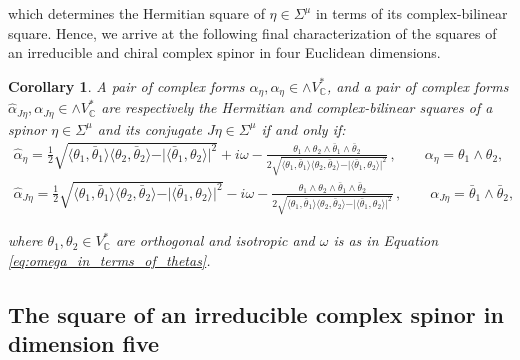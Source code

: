 \documentclass[10pt,a4paper,twoside,reqno]{amsart}
\theoremstyle{plain}
\newtheorem{cor}[thm]{Corollary}
\theoremstyle{definition}
\theoremstyle{remark}
\def\C{\mathbb{C}}
\begin{document}
\noindent
which determines the Hermitian square of $\eta \in \Sigma^{\mu}$ in terms of its complex-bilinear square. Hence, we arrive at the following final characterization of the squares of an irreducible and chiral complex spinor in four Euclidean dimensions.

\begin{cor}
A pair of complex forms $\widehat{\alpha}_\eta, \alpha_\eta \in \wedge V^{\ast}_{\mathbb{C}}$, and a pair of complex forms $\widehat{\alpha}_{J\eta}, \alpha_{J\eta} \in \wedge V^{\ast}_{\mathbb{C}}$ are respectively the Hermitian and complex-bilinear squares of a spinor $\eta\in\Sigma^\mu$ and its conjugate $J\eta\in\Sigma^\mu$ if and only if:
\begin{equation*}
\begin{aligned}
\widehat{\alpha}_{\eta} =    \frac{1}{2} \sqrt{\langle \theta_1 , \bar{\theta}_1 \rangle \langle \theta_2 , \bar{\theta}_2 \rangle - \vert \langle \bar{\theta}_1 , \theta_2 \rangle\vert^2} + i\omega-\frac{\theta_1 \wedge \theta_2 \wedge \bar{\theta}_1 \wedge \bar{\theta}_2}{2\sqrt{\langle \theta_1 , \bar{\theta}_1 \rangle \langle \theta_2 , \bar{\theta}_2 \rangle - \vert \langle \bar{\theta}_1 , \theta_2 \rangle\vert^2}} \, , \qquad \alpha_{\eta} = \theta_1 \wedge \theta_2,\\
\widehat{\alpha}_{J\eta} =    \frac{1}{2} \sqrt{\langle \theta_1 , \bar{\theta}_1 \rangle \langle \theta_2 , \bar{\theta}_2 \rangle - \vert \langle \bar{\theta}_1 , \theta_2 \rangle\vert^2} - i\omega-\frac{\theta_1 \wedge \theta_2 \wedge \bar{\theta}_1 \wedge \bar{\theta}_2}{2\sqrt{\langle \theta_1 , \bar{\theta}_1 \rangle \langle \theta_2 , \bar{\theta}_2 \rangle - \vert \langle \bar{\theta}_1 , \theta_2 \rangle\vert^2}} \, , \qquad \alpha_{J\eta} = \bar{\theta}_1 \wedge \bar{\theta}_2,
\end{aligned}
\end{equation*}

\noindent
where $\theta_1 , \theta_2 \in V^*_\C$ are orthogonal and isotropic and $\omega$ is as in Equation \eqref{eq:omega_in_terms_of_thetas}.
\end{cor}


\subsection{The square of an irreducible complex spinor in dimension five}
\end{document}

